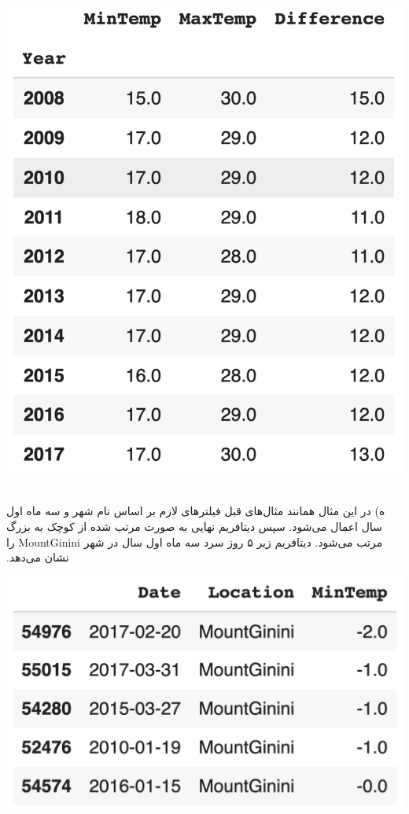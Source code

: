 ‫
‫\begin{center}
‫\includegraphics[scale=0.35]{figs/df2.png}
‫\end{center}
‫
‫ه) در این مثال همانند مثال‌های قبل فیلترهای لازم بر اساس نام شهر و سه ماه اول سال اعمال می‌شود. سپس دیتافریم نهایی به صورت مرتب شده از کوچک به بزرگ مرتب می‌شود. دیتافریم زیر ۵ روز سرد سه ماه اول سال در شهر MountGinini را نشان می‌دهد.
‫
‫\begin{center}
‫\includegraphics[scale=0.35]{figs/df3.png}
‫\end{center}
